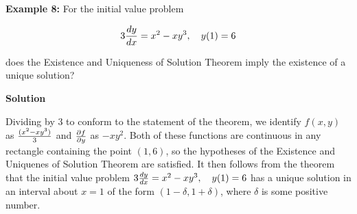 \nopagenumbers
{\bf Example 8:} For the initial value problem

$$3{dy\over dx}=x^2-xy^3,\quad y(1)=6$$

does the Existence and Uniqueness of Solution Theorem imply the existence of a unique solution?


\vskip 10pt
{\bf Solution}

\vskip 6pt
Dividing by $3$ to conform to the statement of the theorem, we identify $f(x,y)$ as ${(x^2-xy^3)\over 3}$ and ${\partial f\over \partial y}$ as $-xy^2$. Both of these functions are continuous in any rectangle containing the point $(1,6)$, so the hypotheses of the Existence and Uniquenes of Solution Theorem are satisfied. It then follows from the theorem that the initial value problem $3{dy\over dx}=x^2-xy^3,\quad y(1)=6$ has a unique solution in an interval about $x=1$ of the form $(1-\delta,1+\delta)$, where $\delta$ is some positive number.

\vfill\eject
\bye
